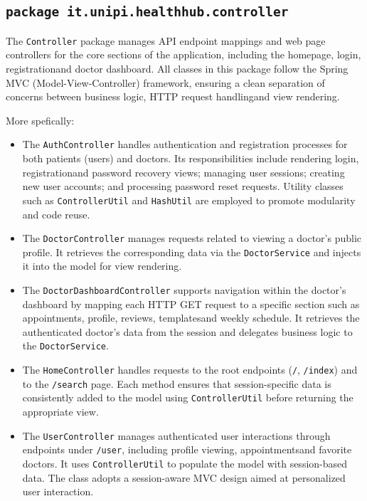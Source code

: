 \subsection{\texttt{package it.unipi.healthhub.controller}}
The \texttt{Controller} package manages API endpoint mappings and web page controllers for the core sections of the application, including the homepage, login, registrationand doctor dashboard. All classes in this package follow the Spring MVC (Model-View-Controller) framework, ensuring a clean separation of concerns between business logic, HTTP request handlingand view rendering.

More spefically:
\begin{itemize}
	\item The \texttt{AuthController} handles authentication and registration processes for both patients (users) and doctors. Its responsibilities include rendering login, registrationand password recovery views; managing user sessions; creating new user accounts; and processing password reset requests. Utility classes such as \texttt{ControllerUtil} and \texttt{HashUtil} are employed to promote modularity and code reuse.
	\item The \texttt{DoctorController} manages requests related to viewing a doctor’s public profile. It retrieves the corresponding data via the \texttt{DoctorService} and injects it into the model for view rendering.
	\item The \texttt{DoctorDashboardController} supports navigation within the doctor's dashboard by mapping each HTTP GET request to a specific section such as appointments, profile, reviews, templatesand weekly schedule. It retrieves the authenticated doctor's data from the session and delegates business logic to the \texttt{DoctorService}.
	\item The \texttt{HomeController} handles requests to the root endpoints (\texttt{/}, \texttt{/index}) and to the \texttt{/search} page. Each method ensures that session-specific data is consistently added to the model using \texttt{ControllerUtil} before returning the appropriate view.
	\item The \texttt{UserController} manages authenticated user interactions through endpoints under \texttt{/user}, including profile viewing, appointmentsand favorite doctors. It uses \texttt{ControllerUtil} to populate the model with session-based data. The class adopts a session-aware MVC design aimed at personalized user interaction.
\end{itemize}

